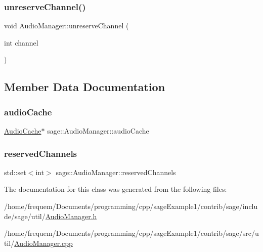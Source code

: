 \subsubsection{\texorpdfstring{unreserveChannel()}{unreserveChannel()}}
{\footnotesize\ttfamily void Audio\+Manager\+::unreserve\+Channel (\begin{DoxyParamCaption}\item[{int}]{channel }\end{DoxyParamCaption})}



\subsection{Member Data Documentation}
\mbox{\label{classsage_1_1AudioManager_a67e231b6321bfb3d884a311522783a9c}} 
\subsubsection{\texorpdfstring{audioCache}{audioCache}}
{\footnotesize\ttfamily \mbox{\hyperlink{classsage_1_1AudioCache}{Audio\+Cache}}$\ast$ sage\+::\+Audio\+Manager\+::audio\+Cache\hspace{0.3cm}{\ttfamily [private]}}

\mbox{\label{classsage_1_1AudioManager_a33e6f086e5dd82256d9b38edf6a56521}} 
\subsubsection{\texorpdfstring{reservedChannels}{reservedChannels}}
{\footnotesize\ttfamily std\+::set$<$int$>$ sage\+::\+Audio\+Manager\+::reserved\+Channels\hspace{0.3cm}{\ttfamily [private]}}



The documentation for this class was generated from the following files\+:\begin{DoxyCompactItemize}
\item 
/home/frequem/\+Documents/programming/cpp/sage\+Example1/contrib/sage/include/sage/util/\mbox{\hyperlink{AudioManager_8h}{Audio\+Manager.\+h}}\item 
/home/frequem/\+Documents/programming/cpp/sage\+Example1/contrib/sage/src/util/\mbox{\hyperlink{AudioManager_8cpp}{Audio\+Manager.\+cpp}}\end{DoxyCompactItemize}
